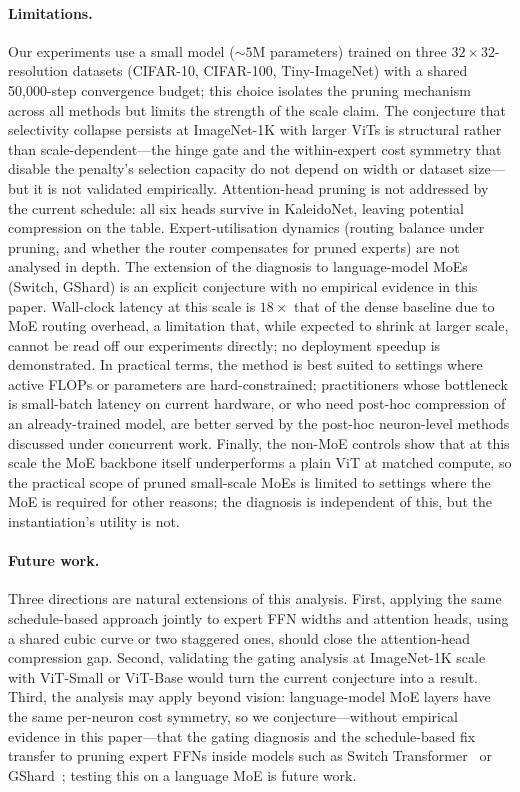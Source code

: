 \documentclass[fleqn,10pt]{article}
\begin{document}
\paragraph{Limitations.}
Our experiments use a small model ($\sim\!5$M parameters) trained on
three $32{\times}32$-resolution datasets (CIFAR-10, CIFAR-100,
Tiny-ImageNet) with a shared 50{,}000-step convergence budget; this
choice isolates the pruning mechanism across all methods but limits
the strength of the scale claim. The conjecture that selectivity
collapse persists at ImageNet-1K with larger ViTs is structural
rather than scale-dependent---the hinge gate and the within-expert
cost symmetry that disable the penalty's selection capacity do not
depend on width or dataset size---but it is not validated
empirically.
Attention-head pruning is not addressed by the current schedule: all
six heads survive in KaleidoNet, leaving potential compression on
the table. Expert-utilisation dynamics (routing balance under
pruning, and whether the router compensates for pruned experts) are
not analysed in depth. The extension of the diagnosis to
language-model MoEs (Switch, GShard) is an explicit conjecture with
no empirical evidence in this paper. Wall-clock latency at this
scale is $18\times$ that of the dense baseline due to MoE routing
overhead, a limitation that, while expected to shrink at larger
scale, cannot be read off our experiments directly; no deployment
speedup is demonstrated. In practical terms, the method is
best suited to settings where active FLOPs or parameters are
hard-constrained; practitioners whose bottleneck is small-batch
latency on current hardware, or who need post-hoc compression of an
already-trained model, are better served by the post-hoc
neuron-level methods discussed under concurrent work. Finally, the
non-MoE controls show that at this scale the MoE backbone itself
underperforms a plain ViT at matched compute, so the practical
scope of pruned small-scale MoEs is limited to settings where the
MoE is required for other reasons; the diagnosis is independent of
this, but the instantiation's utility is not.

\paragraph{Future work.}
Three directions are natural extensions of this analysis. First,
applying the same schedule-based approach jointly to expert FFN
widths and attention heads, using a shared cubic curve or two
staggered ones, should close the attention-head compression gap.
Second, validating the gating analysis at ImageNet-1K scale
with ViT-Small or ViT-Base would turn the current conjecture into a
result. Third, the analysis may apply beyond vision: language-model
MoE layers have the same per-neuron cost symmetry, so we
conjecture---without empirical evidence in this paper---that the
gating diagnosis and the schedule-based fix transfer to pruning
expert FFNs inside models such as Switch
Transformer~\citep{fedus2022switch} or
GShard~\citep{lepikhin2021gshard}; testing this on a language MoE
is future work.
\end{document}
